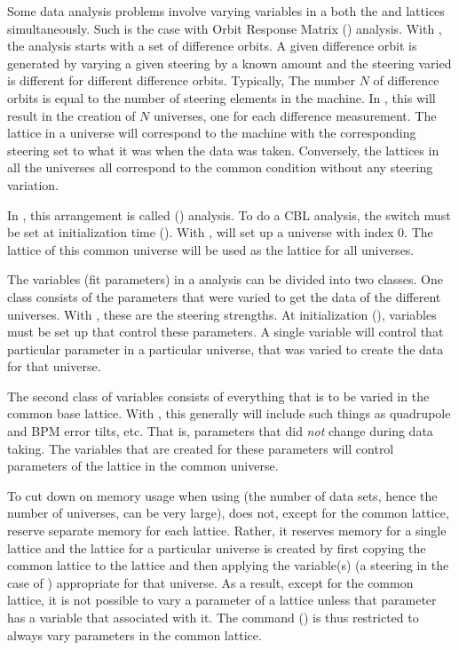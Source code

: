 {{{{{{{{Some data analysis problems involve varying variables in a both the
 and  lattices simultaneously. Such is the case
with Orbit Response Matrix () analysis\cite{b:orm}. With
, the analysis starts with a set of difference orbits. A given
difference orbit is generated by varying a given steering by a known
amount and the steering varied is different for different difference
orbits. Typically, The number $N$ of difference orbits is equal to the
number of steering elements in the machine. In \tao, this will result
in the creation of $N$ universes, one for each difference
measurement. The  lattice in a universe will correspond to
the machine with the corresponding steering set to what it was when
the data was taken. Conversely, the  lattices in all the
universes all correspond to the common condition without any steering
variation.

In \tao, this arrangement is called 
() analysis. To do a CBL analysis, the 
switch must be set at initialization time ().  With
, \tao will set up a  universe with index 0.
The  lattice of this common universe will be used as the
 lattice for all universes. 

The variables (fit parameters) in a  analysis can be divided
into two classes. One class consists of the parameters that were
varied to get the data of the different universes. With ,
these are the steering strengths. At initialization
(), variables must be set up that control these
parameters. A single variable will control that particular parameter in
a particular universe, that was varied to create the data for that
universe. 

The second class of variables consists of everything that is
to be varied in the common base lattice. With , this generally
will include such things as quadrupole and BPM error tilts, etc. That
is, parameters that did {\em not} change during data taking. The
\tao variables that are created for these parameters will control
parameters of the  lattice in the common universe.

To cut down on memory usage when using  (the number of data
sets, hence the number of universes, can be very large), \tao does
not, except for the common  lattice, reserve separate memory
for each  lattice. Rather, it reserves memory for a single
 lattice and the  lattice for a particular
universe is created by first copying the common  lattice to
the  lattice and then applying the variable(s) (a steering
in the case of ) appropriate for that universe.  As a result,
except for the common  lattice, it is not possible to vary a
parameter of a  lattice unless that parameter has a \tao
variable that associated with it. The  command
() is thus restricted to always vary parameters in
the common  lattice.

}}}}}}}}
